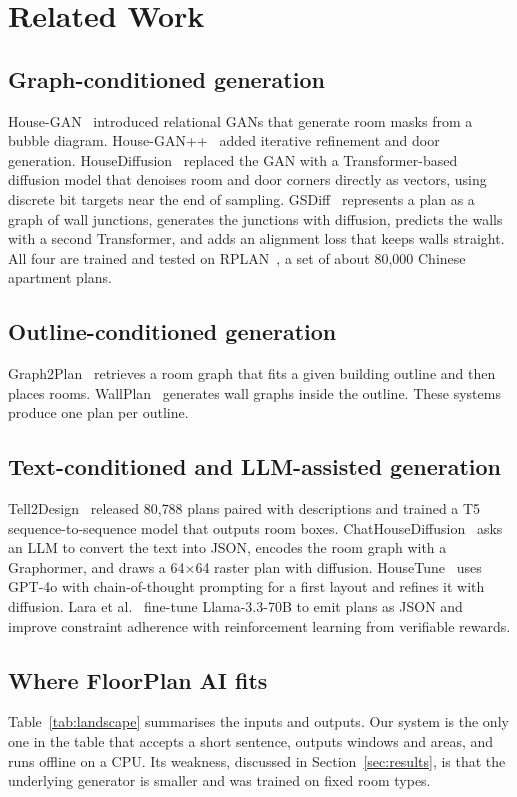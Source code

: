 \documentclass[11pt,a4paper]{article}
\begin{document}
\section{Related Work}\label{sec:related}

\subsection{Graph-conditioned generation}
House-GAN~\cite{housegan} introduced relational GANs that generate room masks
from a bubble diagram. House-GAN++~\cite{housegan2} added iterative refinement
and door generation. HouseDiffusion~\cite{housediffusion} replaced the GAN with a
Transformer-based diffusion model that denoises room and door corners directly as
vectors, using discrete bit targets near the end of sampling. GSDiff~\cite{gsdiff}
represents a plan as a graph of wall junctions, generates the junctions with
diffusion, predicts the walls with a second Transformer, and adds an alignment
loss that keeps walls straight. All four are trained and tested on
RPLAN~\cite{rplan}, a set of about 80{,}000 Chinese apartment plans.

\subsection{Outline-conditioned generation}
Graph2Plan~\cite{graph2plan} retrieves a room graph that fits a given building
outline and then places rooms. WallPlan~\cite{wallplan} generates wall graphs
inside the outline. These systems produce one plan per outline.

\subsection{Text-conditioned and LLM-assisted generation}
Tell2Design~\cite{tell2design} released 80{,}788 plans paired with descriptions
and trained a T5 sequence-to-sequence model that outputs room boxes.
ChatHouseDiffusion~\cite{chathousediffusion} asks an LLM to convert the text into
JSON, encodes the room graph with a Graphormer, and draws a 64$\times$64 raster
plan with diffusion. HouseTune~\cite{housetune} uses GPT-4o with chain-of-thought
prompting for a first layout and refines it with diffusion. Lara et al.~\cite{rlvr}
fine-tune Llama-3.3-70B to emit plans as JSON and improve constraint adherence
with reinforcement learning from verifiable rewards.

\subsection{Where FloorPlan AI fits}
Table~\ref{tab:landscape} summarises the inputs and outputs. Our system is the
only one in the table that accepts a short sentence, outputs windows and areas,
and runs offline on a CPU. Its weakness, discussed in Section~\ref{sec:results},
is that the underlying generator is smaller and was trained on fixed room types.
\end{document}
